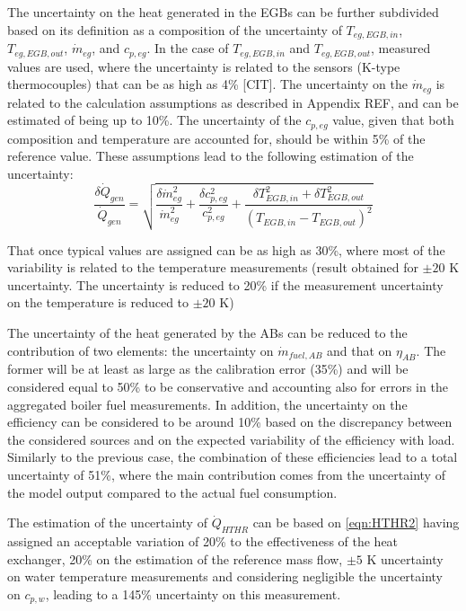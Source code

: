 \documentclass[]{article}
\begin{document}
The uncertainty on the heat generated in the EGBs can be further subdivided based on its definition as a composition of the uncertainty of $T_{eg,EGB,in}$, $T_{eg,EGB,out}$, $\dot{m}_{eg}$, and $c_{p,eg}$. In the case of $T_{eg,EGB,in}$ and $T_{eg,EGB,out}$, measured values are used, where the uncertainty is related to the sensors (K-type thermocouples) that can be as high as 4\% [CIT]. The uncertainty on the $\dot{m}_{eg}$ is related to the calculation assumptions as described in Appendix REF, and can be estimated of being up to 10\%. The uncertainty of the $c_{p,eg}$ value, given that both composition and temperature are accounted for, should be within 5\% of the reference value. These assumptions lead to the following estimation of the uncertainty:
\begin{equation}
\frac{\delta \dot{Q}_{gen}}{\dot{Q}_{gen}} = \sqrt{\frac{\delta \dot{m}_{eg}^2}{\dot{m}_{eg}^2} + \frac{\delta c_{p,eg}^2}{c_{p,eg}^2} + \frac{\delta T_{EGB,in}^2 + \delta T_{EGB,out}^2}{(T_{EGB,in} - T_{EGB,out})^2}}
\end{equation}

That once typical values are assigned can be as high as 30\%, where most of the variability is related to the temperature measurements (result obtained for $\pm 20$ K uncertainty. The uncertainty is reduced to 20\% if the measurement uncertainty on the temperature is reduced to  $\pm 20$ K) 

The uncertainty of the heat generated by the ABs can be reduced to the contribution of two elements: the uncertainty on $\dot{m}_{fuel,AB}$ and that on $\eta_{AB}$. The former will be at least as large as the calibration error (35\%) and will be considered equal to 50\% to be conservative and accounting also for errors in the aggregated boiler fuel measurements. In addition, the uncertainty on the efficiency can be considered to be around 10\% based on the discrepancy between the considered sources and on the expected variability of the efficiency with load. Similarly to the previous case, the combination of these efficiencies lead to a total uncertainty of 51\%, where the main contribution comes from the uncertainty of the model output compared to the actual fuel consumption.

The estimation of the uncertainty of $\dot{Q}_{HTHR}$ can be based on \ref{eqn:HTHR2} having assigned an acceptable variation of 20\% to the effectiveness of the heat exchanger, 20\% on the estimation of the reference mass flow, $\pm 5$ K uncertainty on water temperature measurements and considering negligible the uncertainty on $c_{p,w}$, leading to a 145\% uncertainty on this measurement. 
\end{document}
